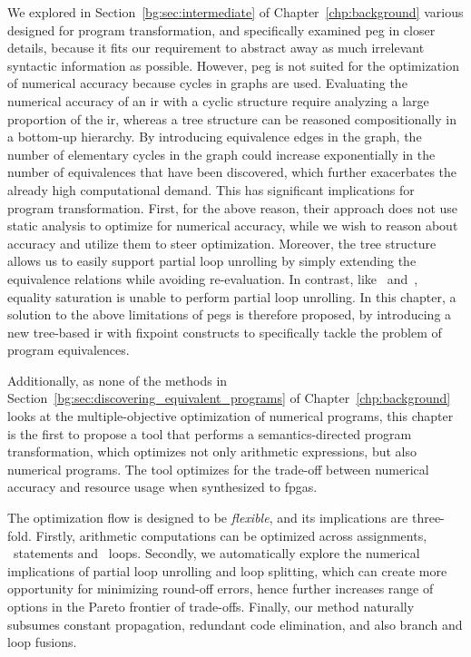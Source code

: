 We explored in Section~\ref{bg:sec:intermediate} of
Chapter~\ref{chp:background} various  designed for program
transformation, and specifically examined \acrfull{peg} in closer details,
because it fits our requirement to abstract away as much irrelevant syntactic
information as possible.  However, \gls{peg} is not suited for the optimization
of numerical accuracy because cycles in graphs are used.  Evaluating the
numerical accuracy of an \gls{ir} with a cyclic structure require analyzing
a large proportion of the \gls{ir}, whereas a tree structure can be reasoned
compositionally in a bottom-up hierarchy.  By introducing equivalence edges
in the graph, the number of elementary cycles in the graph could increase
exponentially in the number of equivalences that have been discovered,
which further exacerbates the already high computational demand.  This has
significant implications for program transformation.  First, for the above
reason, their approach does not use static analysis to optimize for numerical
accuracy, while we wish to reason about accuracy and utilize them to steer
optimization.  Moreover, the tree structure allows us to easily support partial
loop unrolling by simply extending the equivalence relations while avoiding
re-evaluation.  In contrast, like~\cite{martel09} and~\cite{damouche15},
equality saturation is unable to perform partial loop unrolling.  In this
chapter, a solution to the above limitations of \glspl{peg} is therefore
proposed, by introducing a new tree-based \gls{ir} with fixpoint constructs to
specifically tackle the problem of program equivalences.

Additionally, as none of the methods in
Section~\ref{bg:sec:discovering_equivalent_programs} of
Chapter~\ref{chp:background} looks at the multiple-objective optimization of
numerical programs, this chapter is the first to propose a tool that performs a
semantics-directed program transformation, which optimizes not only arithmetic
expressions, but also numerical programs.  The tool optimizes for the trade-off
between numerical accuracy and resource usage when synthesized to \glspl{fpga}.

The optimization flow is designed to be \emph{flexible}, and its implications
are three-fold.  Firstly, arithmetic computations can be optimized across
assignments, \iflit~statements and \whilelit~loops.  Secondly, we automatically
explore the numerical implications of partial loop unrolling and loop
splitting, which can create more opportunity for minimizing round-off errors,
hence further increases range of options in the Pareto frontier of trade-offs.
Finally, our method naturally subsumes constant propagation, redundant code
elimination, and also branch and loop fusions.

